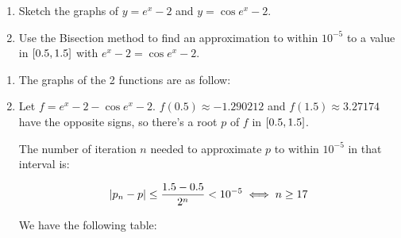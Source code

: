 \documentclass[../../Assignments.tex]{subfiles}
\begin{document}
\begin{exercise}
    \begin{enumerate}[label = (\alph*)]
        \item Sketch the graphs of \(y = e^x - 2\) and \(y = \cos{e^x - 2}\).
        \item Use the Bisection method to find an approximation to within
            \(10^{-5}\) to a value in \(\interval{\num{0.5}}{\num{1.5}}\) with
            \(e^x - 2 = \cos{e^x - 2}\).
    \end{enumerate}
\end{exercise}

\begin{solution}
    \begin{enumerate}[label = (\alph*)]
        \item The graphs of the 2 functions are as follow:

            \begin{center}
                
            \end{center}

        \item Let \(f = e^x - 2 - \cos{e^x - 2}\). \(f(\num{0.5}) \approx
            \num{-1.290212} \) and \(f(\num{1.5}) \approx \num{3.27174}\) have
            the opposite signs, so there's a root \(p\) of \(f\) in
            \(\interval{\num{0.5}}{\num{1.5}}\).

            The number of iteration \(n\) needed to approximate \(p\) to within
            \(10^{-5}\) in that interval is:

            \[\abs{p_n - p} \leq \frac{\num{1.5} - \num{0.5}}{2^n} < 10^{-5} \iff n \geq 17\]

            We have the following table:


\end{enumerate}
\end{solution}
\end{document}
